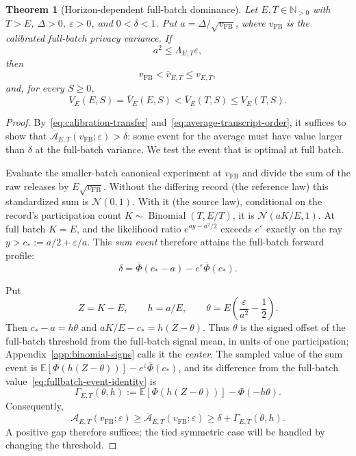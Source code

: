 \documentclass[11pt]{article}
\newtheorem{theorem}{Theorem}[section]
\theoremstyle{remark}
\newcommand{\N}{\mathbb N}
\newcommand{\E}{\mathbb E}
\newcommand{\Normal}{\mathcal N}
\begin{document}
\begin{theorem}[Horizon-dependent full-batch dominance]
\label{thm:rate-adaptive-pointwise}
Let $E,T\in\N_{>0}$ with $T>E$, $\Delta>0$, $\varepsilon>0$, and
$0<\delta<1$. Put $a=\Delta/\sqrt{v_{\mathrm{FB}}}$, where
$v_{\mathrm{FB}}$ is the calibrated full-batch privacy variance. If
\begin{equation}\label{eq:rate-adaptive-signal-condition}
 a^2\leq\Lambda_{E,T}\varepsilon,
\end{equation}
then
\[
 v_{\mathrm{FB}}<\overline v_{E,T}\leq v_{E,T},
\]
and, for every $S\geq0$,
\[
 V_E(E,S)=\overline V_E(E,S)<\overline V_E(T,S)\leq V_E(T,S).
\]
\end{theorem}

\begin{proof}
By~\eqref{eq:calibration-transfer} and~\eqref{eq:average-transcript-order},
it suffices to show that
$\overline{\mathcal A}_{E,T}(v_{\mathrm{FB}};\varepsilon)>\delta$: some event
for the average must have value larger than $\delta$ at the full-batch
variance. We test the event that is optimal at full batch.

Evaluate the smaller-batch canonical experiment at $v_{\mathrm{FB}}$ and
divide the sum of the raw releases by $E\sqrt{v_{\mathrm{FB}}}$. Without the
differing record (the reference law) this standardized sum is $\Normal(0,1)$.
With it (the source law), conditional on the record's participation count
$K\sim\operatorname{Binomial}(T,E/T)$, it is $\Normal(aK/E,1)$. At full batch
$K=E$, and the likelihood ratio $e^{ay-a^2/2}$ exceeds $e^\varepsilon$
exactly on the ray $y>c_*:=a/2+\varepsilon/a$. This \emph{sum event}
therefore attains the full-batch forward profile:
\begin{equation}\label{eq:fullbatch-event-identity}
 \delta=\overline\Phi(c_*-a)-e^\varepsilon\overline\Phi(c_*).
\end{equation}

Put
\[
 Z=K-E,\qquad h=a/E,\qquad
 \theta=E\left(\frac{\varepsilon}{a^2}-\frac12\right).
\]
Then $c_*-a=h\theta$ and $aK/E-c_*=h(Z-\theta)$. Thus $\theta$ is the signed
offset of the full-batch threshold from the full-batch signal mean, in units
of one participation; Appendix~\ref{app:binomial-signs} calls it the
\emph{center}. The sampled value of the sum event is
$\E[\Phi(h(Z-\theta))]-e^\varepsilon\overline\Phi(c_*)$, and its difference
from the full-batch value~\eqref{eq:fullbatch-event-identity} is
\begin{equation}\label{eq:main-count-gap}
 \Gamma_{E,T}(\theta,h)
 :=\E[\Phi(h(Z-\theta))]-\Phi(-h\theta).
\end{equation}
Consequently,
\begin{equation}\label{eq:event-profile-bound}
\mathcal A_{E,T}(v_{\mathrm{FB}};\varepsilon)
 \geq\overline{\mathcal A}_{E,T}(v_{\mathrm{FB}};\varepsilon)
 \geq\delta+\Gamma_{E,T}(\theta,h).
\end{equation}
A positive gap therefore suffices; the tied symmetric case will be handled
by changing the threshold.


\end{proof}
\end{document}
